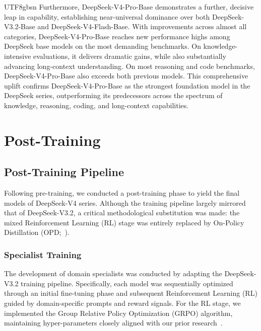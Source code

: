 \documentclass[11pt, a4paper, logo, copyright, nonumbering]{deepseek}
\newcommand{\dsviiiII}{DeepSeek-V3.2}
\newcommand{\dsviv}{DeepSeek-V4}
\newcommand{\dsvivp}{DeepSeek-V4-Pro}
\newcommand{\dsvivf}{DeepSeek-V4-Flash}
\begin{document}
\begin{CJK*}{UTF8}{gbsn}
Furthermore, \dsvivp{}-Base demonstrates a further, decisive leap in capability, establishing near-universal dominance over both \dsviiiII{}-Base and \dsvivf{}-Base. 
With improvements across almost all categories, \dsvivp{}-Base reaches new performance highs among DeepSeek base models on the most demanding benchmarks.
On knowledge-intensive evaluations, it delivers dramatic gains, while also substantially advancing long-context understanding. 
On most reasoning and code benchmarks, \dsvivp{}-Base also exceeds both previous models. 
This comprehensive uplift confirms \dsvivp{}-Base as the strongest foundation model in the DeepSeek series, outperforming its predecessors across the spectrum of knowledge, reasoning, coding, and long-context capabilities.

\section{Post-Training}
\label{sec:post-training}

\subsection{Post-Training Pipeline}

Following pre-training, we conducted a post-training phase to yield the final models of \dsviv{} series. 
Although the training pipeline largely mirrored that of \dsviiiII{}, a critical methodological substitution was made: the mixed Reinforcement Learning (RL) stage was entirely replaced by On-Policy Distillation (OPD;~\citealp{lu2025onpolicydistillation,minillm}).

\subsubsection{Specialist Training}
The development of domain specialists was conducted by adapting the \dsviiiII{} training pipeline. 
Specifically, each model was sequentially optimized through an initial fine-tuning phase and subsequent Reinforcement Learning (RL) guided by domain-specific prompts and reward signals. 
For the RL stage, we implemented the Group Relative Policy Optimization (GRPO) algorithm, maintaining hyper-parameters closely aligned with our prior research~\citep{dsr1,dsv32}. 


\end{CJK*}
\end{document}
